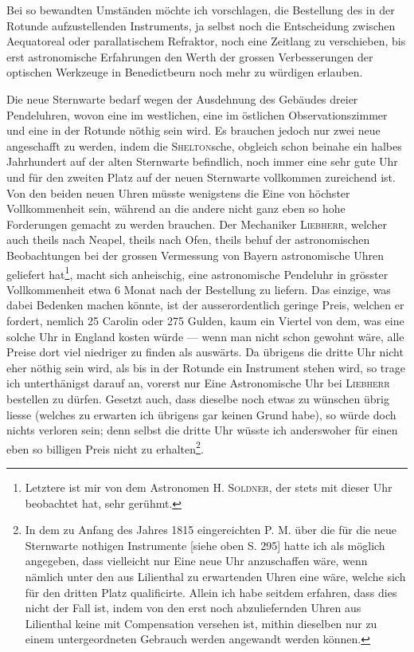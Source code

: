 Bei so bewandten Umständen möchte ich vorschlagen, die Bestellung des in der Rotunde aufzustellenden Instruments, ja selbst noch die Entscheidung zwischen Aequatoreal oder parallatischem Refraktor, noch eine Zeitlang zu verschieben, bis erst astronomische Erfahrungen den Werth der grossen Verbesserungen der optischen Werkzeuge in Benedictbeurn noch mehr zu würdigen erlauben.
\begin{center}\end{center}
\noindent\hspace*{\parindent}Die neue Sternwarte bedarf wegen der Ausdehnung des Gebäudes dreier Pendeluhren, wovon eine im westlichen, eine im östlichen Observationszimmer und eine in der Rotunde nöthig sein wird. Es brauchen jedoch nur zwei neue angeschafft zu werden, indem die \textsc{Shelton}sche, obgleich schon beinahe ein halbes Jahrhundert auf der alten Sternwarte befindlich, noch immer eine sehr gute Uhr und für den zweiten Platz auf der neuen Sternwarte vollkommen zureichend ist. Von den beiden neuen Uhren müsste wenigstens die Eine von höchster Vollkommenheit sein, während an die andere nicht ganz eben so hohe Forderungen gemacht zu werden brauchen. Der Mechaniker \textsc{Liebherr}, welcher auch theils nach Neapel, theils nach Ofen, theils behuf der astronomischen Beobachtungen bei der grossen Vermessung von Bayern astronomische Uhren geliefert hat\begingroup\renewcommand{\thefootnote}{*)}\footnote{Letztere ist mir von dem Astronomen H. \textsc{Soldner}, der stets mit dieser Uhr beobachtet hat, sehr gerühmt.}\endgroup, macht sich anheischig, eine astronomische Pendeluhr in grösster Vollkommenheit etwa 6 Monat nach der Bestellung zu liefern. Das einzige, was dabei Bedenken machen könnte, ist der ausserordentlich geringe Preis, welchen er fordert, nemlich 25 Carolin oder 275 Gulden, kaum ein Viertel von dem, was eine solche Uhr in England kosten würde — wenn man nicht schon gewohnt wäre, alle Preise dort viel niedriger zu finden als auswärts. Da übrigens die dritte Uhr nicht eher nöthig sein wird, als bis in der Rotunde ein Instrument stehen wird, so trage ich unterthänigst darauf an, vorerst nur Eine Astronomische Uhr bei \textsc{Liebherr} bestellen zu dürfen. Gesetzt auch, dass dieselbe noch etwas zu wünschen übrig
\clearpage{}
\noindent liesse (welches zu erwarten ich übrigens gar keinen Grund habe), so würde doch nichts verloren sein; denn selbst die dritte Uhr wüsste ich anderswoher für einen eben so billigen Preis nicht zu erhalten\begingroup\renewcommand{\thefootnote}{*)}\footnote{In dem zu Anfang des Jahres 1815 eingereichten P. M. über die für die neue Sternwarte nothigen Instrumente [siehe oben S. 295] hatte ich als möglich angegeben, dass vielleicht nur Eine neue Uhr anzuschaffen wäre, wenn nämlich unter den aus Lilienthal zu erwartenden Uhren eine wäre, welche sich für den dritten Platz qualificirte. Allein ich habe seitdem erfahren, dass dies nicht der Fall ist, indem von den erst noch abzuliefernden Uhren aus Lilienthal keine mit Compensation versehen ist, mithin dieselben nur zu einem untergeordneten Gebrauch werden angewandt werden können.}\endgroup.

